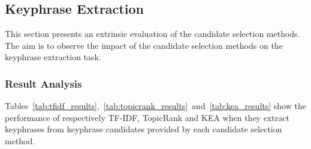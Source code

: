 
  \subsection{Keyphrase Extraction}
  \label{subsec:keyphrase_extraction}
    This section presents an extrinsic evaluation of the candidate selection
    methods. The aim is to observe the impact of the candidate selection
    methods on the keyphrase extraction task.

    \subsubsection{Result Analysis}
    \label{subsubsec:candidate_extraction_result_analysis}
      Tables~\ref{tab:tfidf_results},~\ref{tab:topicrank_results}~and~\ref{tab:kea_results}
      show the performance of respectively TF-IDF, TopicRank and KEA when
      they extract keyphrases from keyphrase candidates provided by each
      candidate selection method.
